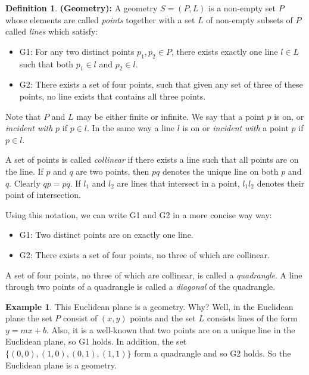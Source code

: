 \documentclass{article}
\theoremstyle{definition}
\newtheorem{definition}{Definition}[section]
\newtheorem{example}{Example}[section]
\begin{document}
\begin{definition} \textbf{(Geometry):} A geometry $S = (P, L)$ is a non-empty set $P$ whose elements are called \emph{points} together with a set $L$ of 
non-empty subsets of $P$ called \emph{lines} which satisfy:
\begin{itemize}
\item G1: For any two distinct points $p_1,p_2 \in P$, there exists exactly one line $l \in L$ such that both $p_1 \in l$ and $p_2 \in l$.
\item G2: There exists a set of four points, such that given any set of three of these points, no line exists that contains all three points.
\end{itemize}

\noindent
Note that $P$ and $L$ may be either finite or infinite. We say that a point $p$ is on, or \emph{incident with} $p$ if $p \in l$. 
In the same way a line $l$ is on or \emph{incident with} a point $p$ if $p \in l$. 

\noindent
A set of points is called \emph{collinear} if there exists a line such that all points are on the line. If $p$ and $q$ are two points, then $pq$ denotes the 
unique line on both $p$ and $q$. Clearly $qp = pq$. If $l_1$ and $l_2$ are lines that intersect in a point, $l_1l_2$ denotes their point of intersection.

\noindent
Using this notation, we can write G1 and G2 in a more concise way way: 
\begin{itemize}
\item G1: Two distinct points are on exactly one line.
\item G2: There exists a set of four points, no three of which are collinear.
\end{itemize}

\noindent
A set of four points, no three of which are collinear, is called a \emph{quadrangle}. A line through two points of a quadrangle is called a \emph{diagonal}
of the quadrangle.
\end{definition}

\begin{example}
This Euclidean plane is a geometry. Why? Well, in the Euclidean plane the set $P$ consist of $(x,y)$ points and the set $L$ consists lines of the
form $y = mx + b$. Also, it is a well-known that two points are on a unique line in the Euclidean plane, so G1 holds.  In addition, the set  $\{(0,0), (1,0), (0,1), (1,1)\}$ 
form a quadrangle and so G2 holds. 
So the Euclidean plane is a geometry.
\end{example}
\end{document}
